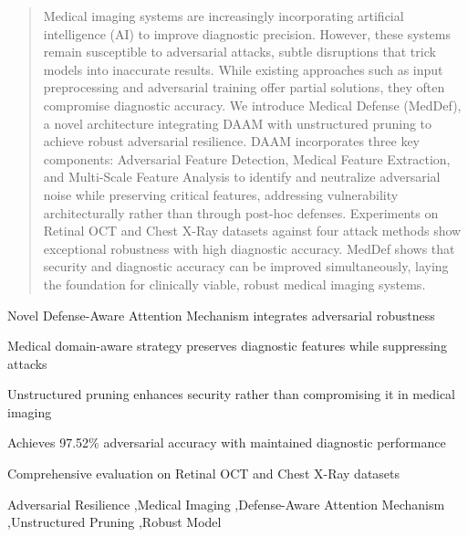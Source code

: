\documentclass[preprint,12pt]{elsarticle}
\begin{document}
\begin{frontmatter}
\begin{abstract}
Medical imaging systems are increasingly incorporating artificial intelligence (AI) to improve diagnostic precision. However, these systems remain susceptible to adversarial attacks, subtle disruptions that trick models into inaccurate results. While existing approaches such as input preprocessing and adversarial training offer partial solutions, they often compromise diagnostic accuracy. We introduce Medical Defense (MedDef), a novel architecture integrating DAAM with unstructured pruning to achieve robust adversarial resilience. DAAM incorporates three key components: Adversarial Feature Detection, Medical Feature Extraction, and Multi-Scale Feature Analysis to identify and neutralize adversarial noise while preserving critical features, addressing vulnerability architecturally rather than through post-hoc defenses. Experiments on Retinal OCT and Chest X-Ray datasets against four attack methods show exceptional robustness with high diagnostic accuracy. MedDef shows that security and diagnostic accuracy can be improved simultaneously, laying the foundation for clinically viable, robust medical imaging systems.
\end{abstract}

\begin{highlights}
\item Novel Defense-Aware Attention Mechanism integrates adversarial robustness
\item Medical domain-aware strategy preserves diagnostic features while suppressing attacks
\item Unstructured pruning enhances security rather than compromising it in medical imaging
\item Achieves 97.52\% adversarial accuracy with maintained diagnostic performance
\item Comprehensive evaluation on Retinal OCT and Chest X-Ray datasets
\end{highlights}

\begin{keyword}
Adversarial Resilience \sep Medical Imaging \sep Defense-Aware Attention Mechanism \sep Unstructured Pruning \sep Robust Model


\end{keyword}

\end{frontmatter}
\end{document}

